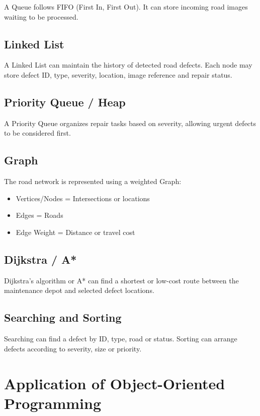 \documentclass[12pt,a4paper]{article}
\begin{document}
A Queue follows FIFO (First In, First Out). It can store incoming road images waiting to be processed.

\subsection{Linked List}

A Linked List can maintain the history of detected road defects. Each node may store defect ID, type, severity, location, image reference and repair status.

\subsection{Priority Queue / Heap}

A Priority Queue organizes repair tasks based on severity, allowing urgent defects to be considered first.

\subsection{Graph}

The road network is represented using a weighted Graph:
\begin{itemize}[leftmargin=*]
    \item Vertices/Nodes = Intersections or locations
    \item Edges = Roads
    \item Edge Weight = Distance or travel cost
\end{itemize}

\subsection{Dijkstra / A*}

Dijkstra's algorithm or A* can find a shortest or low-cost route between the maintenance depot and selected defect locations.

\subsection{Searching and Sorting}

Searching can find a defect by ID, type, road or status. Sorting can arrange defects according to severity, size or priority.

\section{Application of Object-Oriented Programming}
\end{document}
